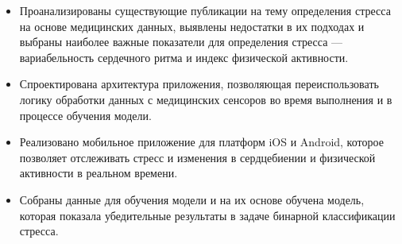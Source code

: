 \documentclass[14pt]{matmex-diploma-custom}
\begin{document}
\begin{itemize}
\item Проанализированы существующие публикации на тему определения стресса на
  основе медицинских данных, выявлены недостатки в их подходах и выбраны
  наиболее важные показатели для определения стресса --- вариабельность
  сердечного ритма и индекс физической активности.
\item Спроектирована архитектура приложения, позволяющая переиспользовать логику
  обработки данных с медицинских сенсоров во время выполнения и в процессе
  обучения модели.
\item Реализовано мобильное приложение для платформ iOS и Android, которое
  позволяет отслеживать стресс и изменения в сердцебиении и физической
  активности в реальном времени.
\item Собраны данные для обучения модели и на их основе обучена модель, которая
  показала убедительные результаты в задаче бинарной классификации стресса.
\end{itemize}

\setmonofont[Path=assets/fonts/, UprightFont=*-Regular, BoldFont=*-Bold,
ItalicFont=*-Italic, BoldItalicFont=*-BoldItalic,
Mapping=tex-text]{CMUTypewriterText}

 
\end{document}
